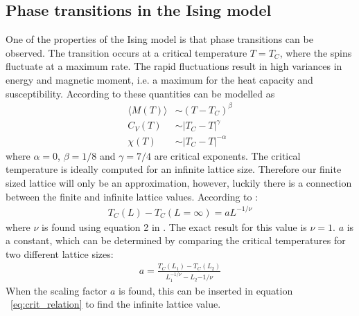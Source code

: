 \documentclass[aps,reprint]{revtex4-1}
\newcommand{\mean}[1]{\langle #1 \rangle}
\begin{document}
\subsection{Phase transitions in the Ising model} \label{sec:phase transitions analytic}
One of the properties of the Ising model is that phase transitions can be
observed. The transition occurs at a critical temperature $T = T_C$, where
the spins fluctuate at a maximum rate. The rapid fluctuations result in high
variances in energy and magnetic moment, i.e. a maximum for the heat capacity
and susceptibility. According to \cite{project4} these quantities can be
modelled as
\begin{align*}
  \mean{M(T)} &\sim (T - T_C)^\beta \\
  C_V(T) &\sim |T_C - T|^\gamma \\
  \chi (T) &\sim |T_C - T|^{-\alpha}
\end{align*}
where $\alpha = 0$, $\beta = 1/8$ and $\gamma = 7/4$ are critical exponents.
The critical temperature is ideally computed for an infinite lattice size. Therefore
our finite sized lattice will only be an approximation, however, luckily there is
a connection between the finite and infinite lattice values. According to
\cite{project4}:
\begin{align}\label{eq:crit_relation}
  T_C(L) - T_C(L = \infty) = a L^{-1/\nu}
\end{align}
where $\nu$ is found using equation 2 in \cite{project4}. The exact result for
this value is $\nu = 1$. $a$ is a constant, which can be determined by comparing
the critical temperatures for two different lattice sizes:
\begin{align}\label{eq:scalingfactor}
  a = \frac{T_C(L_1) - T_C(L_2)}{L_1^{-1/\nu} - L_2{-1/\nu}}
\end{align}
When the scaling factor $a$ is found, this can be inserted in equation ~\ref{eq:crit_relation}
to find the infinite lattice value.
\end{document}
